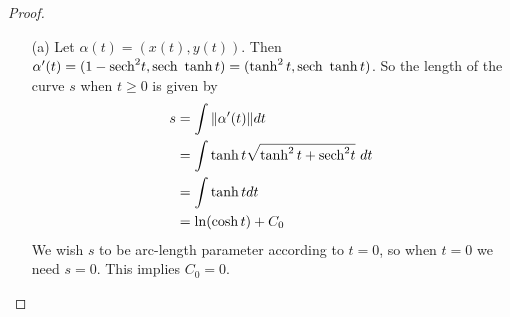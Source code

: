 \documentclass[10pt,a4paper]{article}
\begin{document}
\begin{proof}
\begin{enumerate}
\item[]
\item[(a)] Let $\alpha(t)=(x(t), y(t))$. Then 
$\alpha'(t) = (1-\mbox{sech}^2t, \mbox{sech}\ \tanh t) = (\tanh^2t, \mbox{sech}\ \tanh t)$. So the length of the curve $s$ when $t\ge 0$ is given by
\begin{align*}
s&=\int \|\alpha'(t)\| dt\\
&=\int \tanh t\sqrt{\tanh^2t+\mbox{sech}^2t}\ dt\\
&=\int \tanh t dt\\
&=\ln(\cosh t) + C_0
\end{align*}
We wish $s$ to be arc-length parameter according to $t=0$, so when $t=0$ we need $s=0$. This implies $C_0=0$.


\end{enumerate}
\end{proof}
\end{document}
